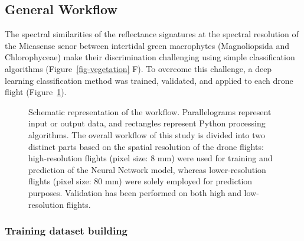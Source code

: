 \documentclass[
  letterpaper,
  11pt,
  english,
  singlespacing,
  headsepline]{MastersDoctoralThesis}
\begin{document}
\begin{spacing}{1.5}
\subsection{General Workflow}\label{general-workflow}

The spectral similarities of the reflectance signatures at the spectral
resolution of the Micasense senor between intertidal green macrophytes
(Magnoliopsida and Chlorophyceae) make their discrimination challenging
using simple classification algorithms (Figure~\ref{fig-vegetation} F).
To overcome this challenge, a deep learning classification method was
trained, validated, and applied to each drone flight
(Figure~\ref{fig-workflow}).

\begin{figure}


\caption{\label{fig-workflow}Schematic representation of the workflow.
Parallelograms represent input or output data, and rectangles represent
Python processing algorithms. The overall workflow of this study is
divided into two distinct parts based on the spatial resolution of the
drone flights: high-resolution flights (pixel size: 8 mm) were used for
training and prediction of the Neural Network model, whereas
lower-resolution flights (pixel size: 80 mm) were solely employed for
prediction purposes. Validation has been performed on both high and
low-resolution flights.}

\end{figure}%

\subsubsection{Training dataset
building}\label{training-dataset-building}


\end{spacing}
\end{document}
